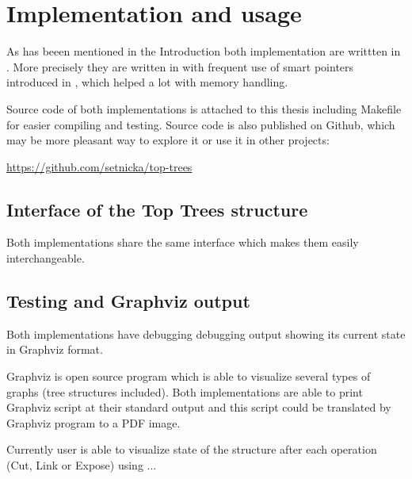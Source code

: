 \chapter{Implementation and usage}

As has beeen mentioned in the Introduction both implementation are writtten
in \Cpp. More precisely they are written in  with frequent use of smart
pointers introduced in , which helped a lot with memory handling.

Source code of both implementations is attached to this thesis including
Makefile for easier compiling and testing. Source code is also published on
Github, which may be more pleasant way to explore it or use it in other
projects:

\bigskip
\centerline{\url{https://github.com/setnicka/top-trees}}
\bigskip

\section{Interface of the Top Trees structure}

Both implementations share the same interface which makes them easily
interchangeable.


\section{Testing and Graphviz output}

Both implementations have debugging debugging output showing its current state
in Graphviz format.

Graphviz is open source program which is able to visualize several types of
graphs (tree structures included). Both implementations are able to print
Graphviz script at their standard output and this script could be translated by
Graphviz program to a PDF image.

Currently user is able to visualize state of the structure after each operation
(Cut, Link or Expose) using ... 
